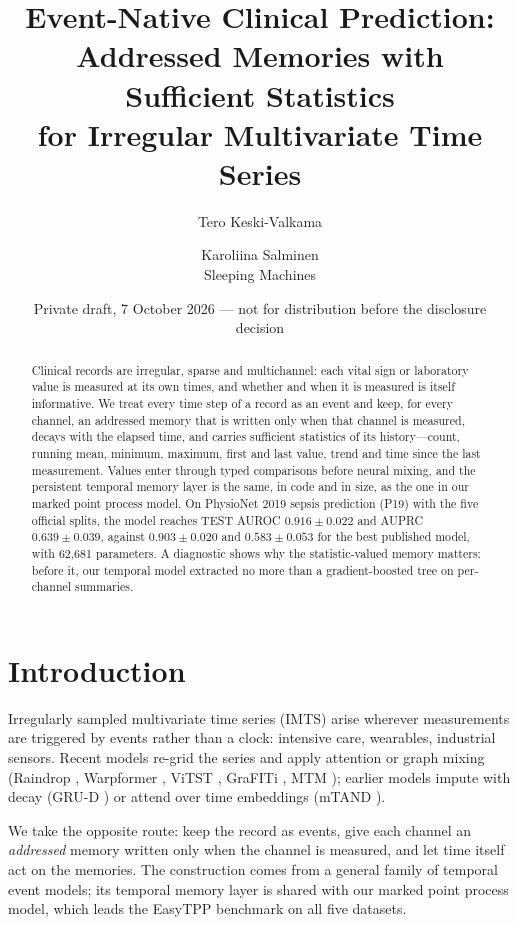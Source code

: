 \documentclass[11pt]{article}
\title{Event-Native Clinical Prediction:\\ Addressed Memories with Sufficient Statistics\\ for Irregular Multivariate Time Series}
\author{Tero Keski-Valkama \and Karoliina Salminen\\ \small Sleeping Machines}
\date{Private draft, 7 October 2026 --- not for distribution before the disclosure decision}
\begin{document}
\maketitle

\begin{abstract}
Clinical records are irregular, sparse and multichannel: each vital sign or laboratory value is measured at its own times, and whether and when it is measured is itself informative. We treat every time step of a record as an event and keep, for every channel, an addressed memory that is written only when that channel is measured, decays with the elapsed time, and carries sufficient statistics of its history---count, running mean, minimum, maximum, first and last value, trend and time since the last measurement. Values enter through typed comparisons before neural mixing, and the persistent temporal memory layer is the same, in code and in size, as the one in our marked point process model. On PhysioNet 2019 sepsis prediction (P19) with the five official splits, the model reaches TEST AUROC $0.916 \pm 0.022$ and AUPRC $0.639 \pm 0.039$, against $0.903 \pm 0.020$ and $0.583 \pm 0.053$ for the best published model, with 62,681 parameters. A diagnostic shows why the statistic-valued memory matters: before it, our temporal model extracted no more than a gradient-boosted tree on per-channel summaries.
\end{abstract}

\section{Introduction}
Irregularly sampled multivariate time series (IMTS) arise wherever measurements are triggered by events rather than a clock: intensive care, wearables, industrial sensors. Recent models re-grid the series and apply attention or graph mixing (Raindrop \citep{zhang2022raindrop}, Warpformer \citep{zhang2023warpformer}, ViTST \citep{li2023vitst}, GraFITi \citep{yalavarthi2024grafiti}, MTM \citep{zhong2025mtm}); earlier models impute with decay (GRU-D \citep{che2018grud}) or attend over time embeddings (mTAND \citep{shukla2021mtand}).

We take the opposite route: keep the record as events, give each channel an \emph{addressed} memory written only when the channel is measured, and let time itself act on the memories. The construction comes from a general family of temporal event models; its temporal memory layer is shared with our marked point process model, which leads the EasyTPP benchmark on all five datasets.
\end{document}
